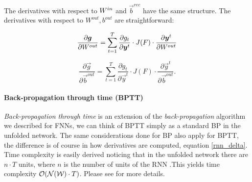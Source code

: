 The derivatives with respect to $W^{in}$ and $\vec{b}^{rec}$ have the same structure.
The derivatives with respect to $W^{out}, b^{out}$ are straightforward:

\begin{equation}
\frac{\partial \boldsymbol{g}}{\partial W^{out}} = \sum_{t=1}^T \frac{\partial g_t}{\partial \boldsymbol{y}^t} \cdot J(F) \cdot \frac{\partial \boldsymbol{y}^t}{\partial W^{out}}
\end{equation}

\begin{equation}
\frac{\partial \vec{g}}{\partial \vec{b}^{out}} = \sum_{t=1}^T \frac{\partial g_t}{\partial \vec{y}^t} \cdot J(F) \cdot \frac{\partial \vec{y}^t}{\partial \vec{b}^{out}}.
\end{equation}

\paragraph{Back-propagation through time (BPTT)}
\textit{Back-propagation through time} is an extension of the \textit{back-propagation} algorithm we described for FNNs, we can think of BPTT
simply as a standard BP in the unfolded network. The same considerations done for BP also apply for BPTT, the difference is of course in how derivatives
are computed, equation \ref{rnn_delta}. Time complexity is easily derived noticing that in the unfolded network there are $n \cdot T$ units, where $n$ is the number of units of the RNN .This
yields time complexity $\mathcal{O}(\mathcal{N}(\mathcal{W})\cdot T)$. Please see \cite{Williams90anefficient} for more details.






